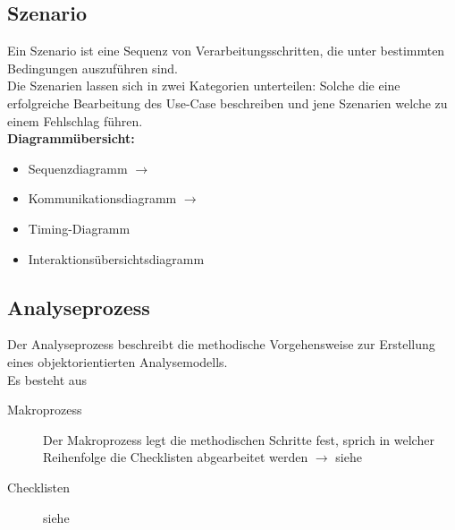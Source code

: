 	\subsection{Szenario }
  		Ein Szenario ist eine Sequenz von Verarbeitungsschritten, die unter bestimmten
  		Bedingungen auszuführen sind.\\
  		Die Szenarien lassen sich in zwei Kategorien unterteilen: Solche die eine erfolgreiche Bearbeitung
  des Use-Case beschreiben und jene Szenarien welche zu einem Fehlschlag führen. \\
  
  \textbf{Diagrammübersicht:}
  \begin{multicols}{2}
  	\begin{itemize}[leftmargin=0.5cm]
    	\item Sequenzdiagramm $\rightarrow$ 
    	\item Kommunikationsdiagramm $\rightarrow$ 
    	\item Timing-Diagramm
    	\item Interaktionsübersichtsdiagramm
  	\end{itemize}
  \end{multicols}
  
\subsection{Analyseprozess }
  Der Analyseprozess beschreibt die methodische Vorgehensweise zur Erstellung eines objektorientierten Analysemodells.\\
  
  Es besteht aus
  \begin{description}
    \item[Makroprozess]
      Der Makroprozess legt die methodischen Schritte fest, sprich in welcher
      Reihenfolge die Checklisten abgearbeitet werden $\rightarrow$ siehe 
    \item[Checklisten]
      siehe 
  \end{description}
  